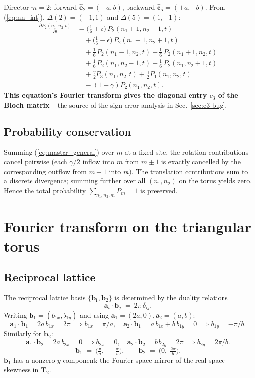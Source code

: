 \documentclass[11pt,a4paper]{article}
\newcommand{\nn}{\nonumber \\}
\newcommand{\va}[1]{\mathbf{a}_{#1}}
\newcommand{\vb}[1]{\mathbf{b}_{#1}}
\newcommand{\veps}[1]{\hat{\mathbf{e}}_{#1}}
\newcommand{\vT}[1]{\mathbf{T}_{#1}}
\begin{document}
Director $m = 2$: forward $\veps{2} = (-a, b)$, backward $\veps{5} = (+a, -b)$.
From (\ref{eq:nn_int}), $\Delta(2) = (-1, 1)$ and $\Delta(5) = (1, -1)$:
\begin{align}\label{eq:master_m2}
\frac{\partial P_2(n_1, n_2, t)}{\partial t}
&= \big(\tfrac{1}{6} + \epsilon\big)\, P_2(n_1 + 1, n_2 - 1, t) \nn
&\quad + \big(\tfrac{1}{6} - \epsilon\big)\, P_2(n_1 - 1, n_2 + 1, t) \nn
&\quad + \tfrac{1}{6}\, P_2(n_1 - 1, n_2, t) + \tfrac{1}{6}\, P_2(n_1 + 1, n_2, t) \nn
&\quad + \tfrac{1}{6}\, P_2(n_1, n_2 - 1, t) + \tfrac{1}{6}\, P_2(n_1, n_2 + 1, t) \nn
&\quad + \tfrac{\gamma}{2} P_3(n_1, n_2, t) + \tfrac{\gamma}{2} P_1(n_1, n_2, t) \nn
&\quad - (1 + \gamma) P_2(n_1, n_2, t).
\end{align}
\textbf{This equation's Fourier transform gives the diagonal entry $c_3$
of the Bloch matrix} -- the source of the sign-error analysis in
Sec.~\ref{sec:c3-bug}.

\subsection{Probability conservation}\label{ssec:prob-conservation}

Summing (\ref{eq:master_general}) over $m$ at a fixed site, the
rotation contributions cancel pairwise (each $\gamma/2$ inflow into $m$
from $m \pm 1$ is exactly cancelled by the corresponding outflow from
$m \pm 1$ into $m$). The translation contributions sum to a discrete
divergence; summing further over all $(n_1, n_2)$ on the torus yields
zero. Hence the total probability $\sum_{n_1, n_2, m} P_m = 1$ is preserved.

\section{Fourier transform on the triangular torus}\label{sec:fourier}

\subsection{Reciprocal lattice}\label{ssec:reciprocal}

The reciprocal lattice basis $\{\vb{1}, \vb{2}\}$ is determined by the
duality relations
\begin{equation}\label{eq:reciprocal_def}
\va{i} \cdot \vb{j} \;=\; 2\pi\, \delta_{ij}.
\end{equation}
Writing $\vb{1} = (b_{1x}, b_{1y})$ and using
$\va{1} = (2a, 0), \va{2} = (a, b)$:
\[
\va{1} \cdot \vb{1} = 2a\, b_{1x} = 2\pi \implies b_{1x} = \pi/a, \quad
\va{2} \cdot \vb{1} = a\, b_{1x} + b\, b_{1y} = 0 \implies b_{1y} = -\pi/b.
\]
Similarly for $\vb{2}$:
\[
\va{1} \cdot \vb{2} = 2a\, b_{2x} = 0 \implies b_{2x} = 0, \quad
\va{2} \cdot \vb{2} = b\, b_{2y} = 2\pi \implies b_{2y} = 2\pi/b.
\]
\begin{equation}\label{eq:reciprocal_vecs}
\boxed{\;\;
\vb{1} \;=\; \Big(\tfrac{\pi}{a},\; -\tfrac{\pi}{b}\Big), \qquad
\vb{2} \;=\; \Big(0,\;\tfrac{2\pi}{b}\Big).
\;\;}
\end{equation}
$\vb{1}$ has a nonzero $y$-component: the Fourier-space mirror of the
real-space skewness in $\vT{2}$.
\end{document}

